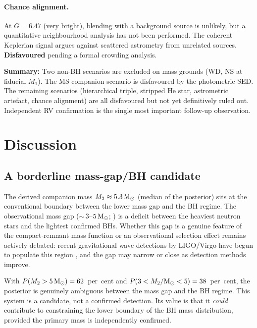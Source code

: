 \documentclass[usenatbib,fleqn]{mnras}
\newcommand{\Msun}{{\rm M}_\odot}
\begin{document}
\paragraph{Chance alignment.}
At $G = 6.47$ (very bright), blending with a background source
is unlikely, but a quantitative neighbourhood analysis has not
been performed.  The coherent Keplerian signal argues against
scattered astrometry from unrelated sources.
\textbf{Disfavoured} pending a formal crowding analysis.

\medskip\noindent
\textbf{Summary:} Two non-BH scenarios are excluded on mass grounds
(WD, NS at fiducial $M_1$).  The MS companion scenario is
disfavoured by the photometric SED.  The remaining scenarios
(hierarchical triple, stripped He star, astrometric artefact,
chance alignment) are all disfavoured but not yet definitively
ruled out.  Independent RV confirmation is the single most
important follow-up observation.

\section{Discussion}
\label{sec:discussion}

\subsection{A borderline mass-gap/BH candidate}

The derived companion mass $M_2 \approx 5.3\,\Msun$ (median of the
posterior) sits at the conventional boundary between the lower mass
gap and the BH regime.  The observational mass gap
($\sim$\,$3$--$5\,\Msun$; \citealt{Bailyn1998, Ozel2010,
Farr2011}) is a deficit between the heaviest neutron stars and the
lightest confirmed BHs.  Whether this gap is a genuine feature
of the compact-remnant mass function or an observational
selection effect remains actively debated: recent gravitational-wave
detections by LIGO/Virgo have begun to populate this region
\citep{Jayasinghe2021, Thompson2019}, and the gap may
narrow or close as detection methods improve.

With $P(M_2 > 5\,\Msun) = 62$~per~cent and $P(3 < M_2/\Msun < 5)
= 38$~per~cent, the posterior is genuinely ambiguous between the
mass gap and the BH regime.  This system is a candidate, not a
confirmed detection.  Its value is that it \emph{could} contribute
to constraining the lower boundary of the BH mass distribution,
provided the primary mass is independently confirmed.
\end{document}
